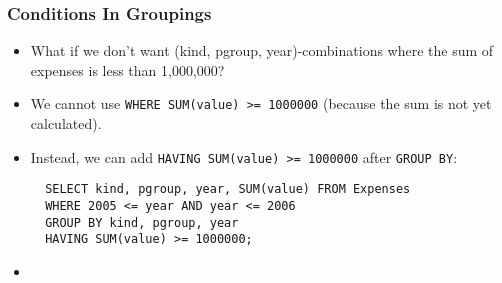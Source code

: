 \documentclass[dvipsnames]{beamer}
\begin{document}
\begin{frame}[fragile]
\frametitle{Conditions In Groupings}

\begin{itemize}

\item<1-> What if we don't want (kind, pgroup, year)-combinations
  where the sum of expenses is less than 1,000,000? 

\item<1-> We cannot use \texttt{WHERE SUM(value) >= 1000000} (because
  the sum is not yet calculated).

\item<2-> Instead, we can add \texttt{HAVING SUM(value) >= 1000000} after
  \texttt{GROUP BY}:
\begin{footnotesize}
\begin{verbatim}
  SELECT kind, pgroup, year, SUM(value) FROM Expenses
  WHERE 2005 <= year AND year <= 2006 
  GROUP BY kind, pgroup, year
  HAVING SUM(value) >= 1000000;
\end{verbatim}
\end{footnotesize}

\item<3-> 

\end{itemize}
\end{frame}
\end{document}
